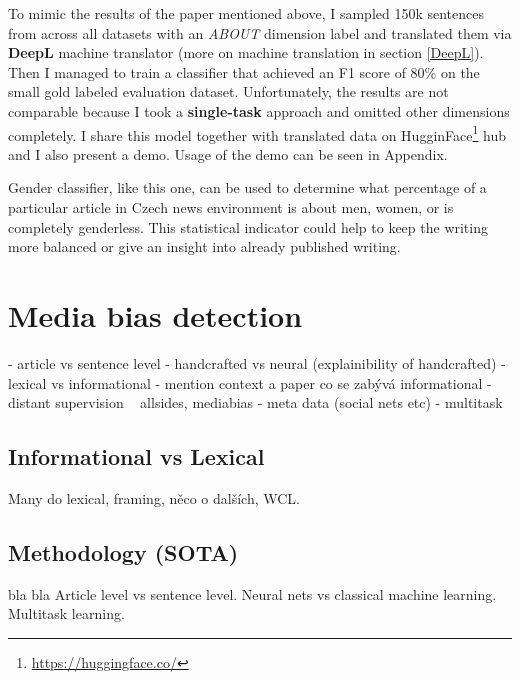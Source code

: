 To mimic the results of the paper mentioned above, I sampled 150k sentences from across all datasets with an \textit{ABOUT} dimension label and translated them via \textbf{DeepL} machine translator (more on machine translation in section \ref{DeepL}). Then I managed to train a classifier that achieved an F1 score of 80\% on the small gold labeled evaluation dataset. Unfortunately, the results are not comparable because I took a \textbf{single-task} approach and omitted other dimensions completely. I share this model together with translated data on HugginFace\footnote{\url{https://huggingface.co/}} hub and I also present a demo. Usage of the demo can be seen in Appendix.

Gender classifier, like this one, can be used to determine what percentage of a particular article in Czech news environment is about men, women, or is completely genderless. This statistical indicator could help to keep the writing more balanced or give an insight into already published writing.





\section{Media bias detection}

- article vs sentence level
- handcrafted vs neural (explainibility of handcrafted)
- lexical vs informational - mention context a paper co se zabývá informational
- distant supervision ~ allsides, mediabias
- meta data (social nets etc)
- multitask



\subsection{Informational vs Lexical}
Many do lexical, framing, něco o dalších, WCL.
\subsection{Methodology (SOTA)}\label{methodology}
bla bla Article level vs sentence level. Neural nets vs classical machine learning. Multitask learning.